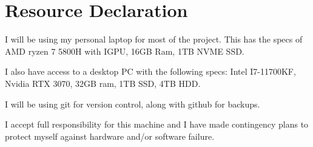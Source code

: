 \section*{Resource Declaration}

I will be using my personal laptop for most of the project. This has
the specs of AMD ryzen 7 5800H with IGPU, 16GB Ram, 1TB NVME SSD.

I also have access to a desktop PC with the following specs:
Intel I7-11700KF, Nvidia RTX 3070, 32GB ram, 1TB SSD, 4TB HDD.

I will be using git for version control, along with github for backups.

I accept full responsibility for this machine and I have made contingency plans
to protect myself against hardware and/or software failure.
